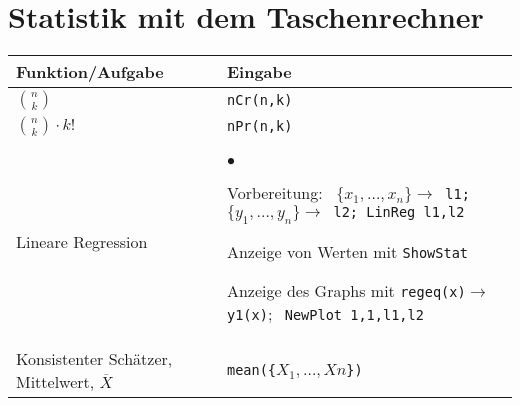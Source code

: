 \section{Statistik mit dem Taschenrechner}

\begin{center}
\begin{tabular}{|p{4cm}|p{11cm}|}
\hline
\textbf{Funktion/Aufgabe} & \textbf{Eingabe} \\
\hline

$\binom{n}{k}$ & \tt{nCr(n,k)} \\
\hline
$\binom{n}{k}\cdot k!$ & \tt{nPr(n,k)} \\
\hline

Lineare Regression &     
\begin{list}{$\bullet$}{\setlength{\itemsep}{0cm}
	\setlength{\parsep}{0cm} \setlength{\topsep}{0cm}}  
	\item Vorbereitung:\newline
		\texttt{
			$\{x_1, \ldots, x_n\} \rightarrow$ l1;
			$\{y_1, \ldots, y_n\} \rightarrow$ l2;
			LinReg l1,l2}
	 \item Anzeige von Werten mit \newline \texttt{ShowStat}
	 \item Anzeige des Graphs mit \newline
	 	\texttt{regeq(x)}$\rightarrow$\texttt{y1(x)}$; \;$
	    \texttt{NewPlot 1,1,l1,l2}
\end{list} \\
\hline

Konsistenter Schätzer, Mittelwert, $\overline{X}$ &
\tt{mean(\{}$X_1,\ldots,Xn$\tt{\})} \\
\hline


\end{tabular}
\end{center}